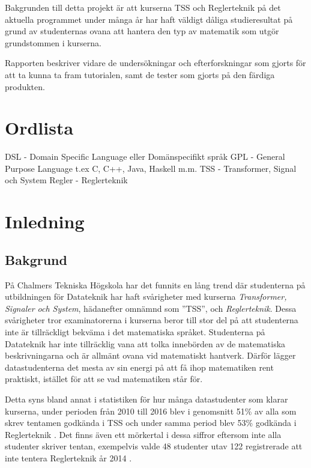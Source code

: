 \documentclass[]{article}
\begin{document}
Bakgrunden till detta projekt är att kurserna TSS och Reglerteknik på det aktuella programmet under många år har haft väldigt dåliga studieresultat på grund av studenternas ovana att hantera den typ av matematik som utgör grundstommen i kurserna.

Rapporten beskriver vidare de undersökningar och efterforskningar som gjorts för att ta kunna ta fram tutorialen, samt de tester som gjorts på den färdiga produkten.

\section{Ordlista}
DSL - Domain Specific Language eller Domänspecifikt språk
GPL - General Purpose Language t.ex C, C++, Java, Haskell m.m.
TSS - Transformer, Signal och System
Regler - Reglerteknik

\section{Inledning}

\subsection{Bakgrund}

%

På Chalmers Tekniska Högskola har det funnits en lång trend där
studenterna på utbildningen för Datateknik har haft svårigheter
med kurserna \textit{Transformer, Signaler och System}, hädanefter omnämnd
som ''TSS'', och \textit{Reglerteknik}.
Dessa svårigheter tror examinatorerna i kurserna beror till stor del på att
studenterna inte är tillräckligt bekväma i det matematiska språket.
Studenterna på Datateknik har inte tillräcklig vana att tolka innebörden av de matematiska beskrivningarna och är allmänt ovana vid matematiskt hantverk.
Därför lägger datastudenterna det mesta av sin energi på att få ihop matematiken
rent praktiskt, istället för att se vad matematiken står för.

Detta syns bland annat i statistiken för hur många datastudenter som
klarar kurserna, under perioden från 2010 till 2016 blev i genomsnitt 51\% av
alla som skrev tentamen godkända i TSS och under samma period blev 53\% godkända
i Reglerteknik \cite{tentastatistik}. Det finns även ett mörkertal i dessa siffror
eftersom inte alla studenter skriver tentan, exempelvis valde 48 studenter utav 122
registrerade att inte tentera Reglerteknik år 2014 \cite{kursinformation:ere102:14-15}.
\end{document}
